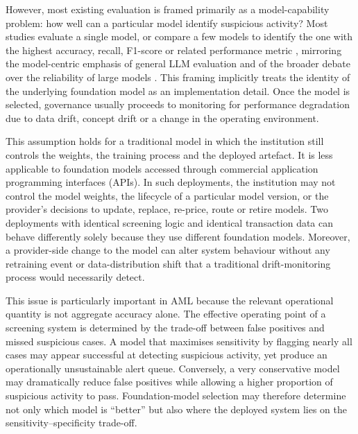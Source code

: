 \documentclass[pdflatex,sn-basic,Numbered]{sn-jnl}
\begin{document}
However, most existing evaluation is framed primarily as a model-capability problem: how well can a particular model identify suspicious activity? Most studies evaluate a single model, or compare a few models to identify the one with the highest accuracy, recall, F1-score or related performance metric \cite{disc-alshatri,disc-bekkaye,disc-najem,disc-yang}, mirroring the model-centric emphasis of general LLM evaluation and of the broader debate over the reliability of large models \cite{helm,parrots}. This framing implicitly treats the identity of the underlying foundation model as an implementation detail. Once the model is selected, governance usually proceeds to monitoring for performance degradation due to data drift, concept drift or a change in the operating environment.

This assumption holds for a traditional model in which the institution still controls the weights, the training process and the deployed artefact. It is less applicable to foundation models accessed through commercial application programming interfaces (APIs). In such deployments, the institution may not control the model weights, the lifecycle of a particular model version, or the provider's decisions to update, replace, re-price, route or retire models. Two deployments with identical screening logic and identical transaction data can behave differently solely because they use different foundation models. Moreover, a provider-side change to the model can alter system behaviour without any retraining event or data-distribution shift that a traditional drift-monitoring process would necessarily detect.

This issue is particularly important in AML because the relevant operational quantity is not aggregate accuracy alone. The effective operating point of a screening system is determined by the trade-off between false positives and missed suspicious cases. A model that maximises sensitivity by flagging nearly all cases may appear successful at detecting suspicious activity, yet produce an operationally unsustainable alert queue. Conversely, a very conservative model may dramatically reduce false positives while allowing a higher proportion of suspicious activity to pass. Foundation-model selection may therefore determine not only which model is ``better'' but also where the deployed system lies on the sensitivity--specificity trade-off.
\end{document}
